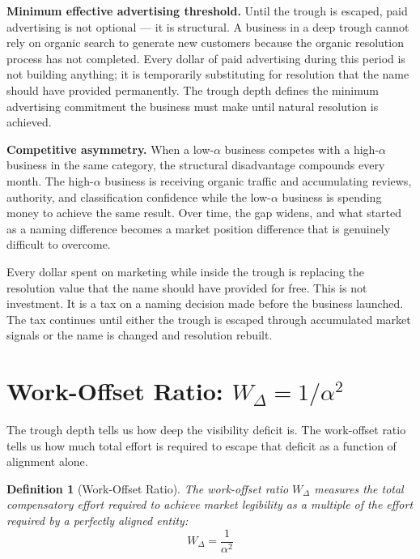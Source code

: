 \documentclass[12pt, openany]{book}
\theoremstyle{thmstyle}
\theoremstyle{defstyle}
\newtheorem{definition}{Definition}[chapter]
\newcommand{\Wdelta}{W_{\Delta}}
\begin{document}
\textbf{Minimum effective advertising threshold.} Until the trough is escaped, paid advertising is not optional --- it is structural. A business in a deep trough cannot rely on organic search to generate new customers because the organic resolution process has not completed. Every dollar of paid advertising during this period is not building anything; it is temporarily substituting for resolution that the name should have provided permanently. The trough depth defines the minimum advertising commitment the business must make until natural resolution is achieved.

\textbf{Competitive asymmetry.} When a low-$\alpha$ business competes with a high-$\alpha$ business in the same category, the structural disadvantage compounds every month. The high-$\alpha$ business is receiving organic traffic and accumulating reviews, authority, and classification confidence while the low-$\alpha$ business is spending money to achieve the same result. Over time, the gap widens, and what started as a naming difference becomes a market position difference that is genuinely difficult to overcome.

\begin{keybox}
Every dollar spent on marketing while inside the trough is replacing the resolution value that the name should have provided for free. This is not investment. It is a tax on a naming decision made before the business launched. The tax continues until either the trough is escaped through accumulated market signals or the name is changed and resolution rebuilt.
\end{keybox}

\section{Work-Offset Ratio: $W_\Delta = 1/\alpha^2$}

The trough depth tells us how deep the visibility deficit is. The work-offset ratio tells us how much total effort is required to escape that deficit as a function of alignment alone.

\begin{definition}[Work-Offset Ratio]
The work-offset ratio $\Wdelta$ measures the total compensatory effort required to achieve market legibility as a multiple of the effort required by a perfectly aligned entity:
\begin{equation}
W_{\Delta} = \frac{1}{\alpha^2}
\label{eq:wdelta}
\end{equation}
\end{definition}
\end{document}
